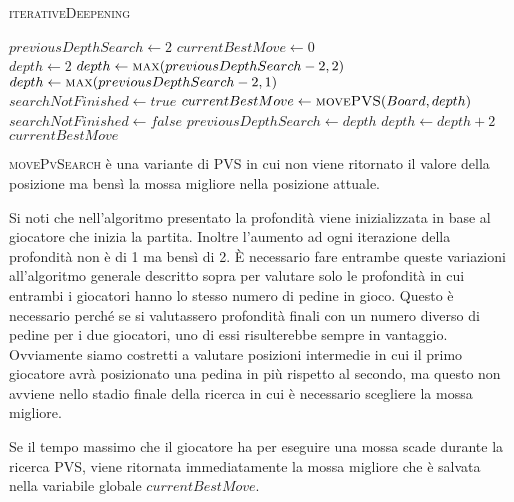 \documentclass[a4paper]{article}
\begin{document}
\begin{algorithm}
  \caption{\textsc{iterativeDeepening}}
  \label{alg_iterativeDeepening}
  \begin{algorithmic}
    \State $previousDepthSearch \gets 2$
    \State $currentBestMove \gets 0$
    \\
      \State $depth \gets 2$
        \State $depth \gets \Call{max}{previousDepthSearch - 2, 2}$
      \Else
        \State $depth \gets \Call{max}{previousDepthSearch - 2, 1}$ 
      \EndIf
      \\
      \State $searchNotFinished \gets true$
        \State $currentBestMove \gets \Call{movePVS}{Board, depth}$
          \State $searchNotFinished \gets false$
        \EndIf
        \State $previousDepthSearch \gets depth$
        \State $depth \gets depth + 2$
      \EndWhile
      \State \Return $currentBestMove$
    \EndFunction
  \end{algorithmic}
\end{algorithm}

\textsc{movePvSearch} è una variante di PVS in cui non viene ritornato il 
valore della posizione ma bensì la mossa migliore nella posizione attuale.

Si noti che nell'algoritmo presentato la profondità viene inizializzata in base 
al giocatore che inizia la partita. Inoltre l'aumento ad ogni iterazione della 
profondità non è di 1 ma bensì di 2. È necessario fare entrambe queste 
variazioni all'algoritmo generale descritto sopra per valutare solo le 
profondità in cui entrambi i giocatori hanno lo stesso numero di pedine in 
gioco. Questo è necessario perché se si valutassero profondità finali con un 
numero diverso di pedine per i due giocatori, uno di essi risulterebbe sempre in 
vantaggio. Ovviamente siamo costretti a valutare posizioni intermedie in cui il
primo giocatore avrà posizionato una pedina in più rispetto al secondo, ma 
questo non avviene nello stadio finale della ricerca in cui è necessario 
scegliere la mossa migliore.

Se il tempo massimo che il giocatore ha per eseguire una mossa scade durante
la ricerca PVS, viene ritornata immediatamente la mossa migliore che è salvata
nella variabile globale $currentBestMove$.
\end{document}
